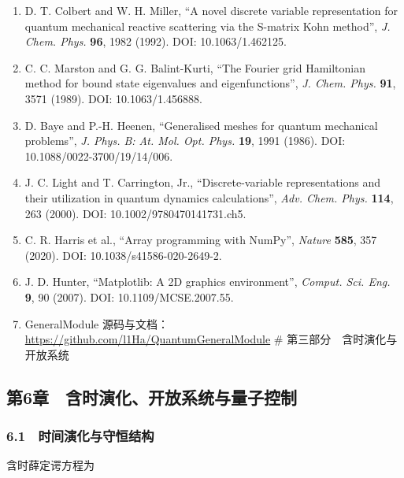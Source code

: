 \documentclass[
]{ctexbook}
\providecommand{\tightlist}{%
  \setlength{\itemsep}{0pt}\setlength{\parskip}{0pt}}
\let\origsubsection\subsection
\renewcommand{\subsection}[1]{%
  \needspace{6\baselineskip}%
  \origsubsection{#1}%
}
\begin{document}
\begin{enumerate}
\def\labelenumi{\arabic{enumi}.}
\tightlist
\item
  D. T. Colbert and W. H. Miller, ``A novel discrete variable
  representation for quantum mechanical reactive scattering via the
  S-matrix Kohn method'', \emph{J. Chem. Phys.} \textbf{96}, 1982
  (1992). DOI: 10.1063/1.462125.
\item
  C. C. Marston and G. G. Balint-Kurti, ``The Fourier grid Hamiltonian
  method for bound state eigenvalues and eigenfunctions'', \emph{J.
  Chem. Phys.} \textbf{91}, 3571 (1989). DOI: 10.1063/1.456888.
\item
  D. Baye and P.-H. Heenen, ``Generalised meshes for quantum mechanical
  problems'', \emph{J. Phys. B: At. Mol. Opt. Phys.} \textbf{19}, 1991
  (1986). DOI: 10.1088/0022-3700/19/14/006.
\item
  J. C. Light and T. Carrington, Jr., ``Discrete-variable
  representations and their utilization in quantum dynamics
  calculations'', \emph{Adv. Chem. Phys.} \textbf{114}, 263 (2000). DOI:
  10.1002/9780470141731.ch5.
\item
  C. R. Harris et al., ``Array programming with NumPy'', \emph{Nature}
  \textbf{585}, 357 (2020). DOI: 10.1038/s41586-020-2649-2.
\item
  J. D. Hunter, ``Matplotlib: A 2D graphics environment'', \emph{Comput.
  Sci. Eng.} \textbf{9}, 90 (2007). DOI: 10.1109/MCSE.2007.55.
\item
  GeneralModule
  源码与文档：\url{https://github.com/l1Ha/QuantumGeneralModule} \#
  第三部分　含时演化与开放系统
\end{enumerate}

\hypertarget{ux7b2c6ux7ae0-ux542bux65f6ux6f14ux5316ux5f00ux653eux7cfbux7edfux4e0eux91cfux5b50ux63a7ux5236}{%
\subsection{第6章　含时演化、开放系统与量子控制}\label{ux7b2c6ux7ae0-ux542bux65f6ux6f14ux5316ux5f00ux653eux7cfbux7edfux4e0eux91cfux5b50ux63a7ux5236}}

\hypertarget{ux65f6ux95f4ux6f14ux5316ux4e0eux5b88ux6052ux7ed3ux6784}{%
\subsubsection{6.1　时间演化与守恒结构}\label{ux65f6ux95f4ux6f14ux5316ux4e0eux5b88ux6052ux7ed3ux6784}}

含时薛定谔方程为
\end{document}
